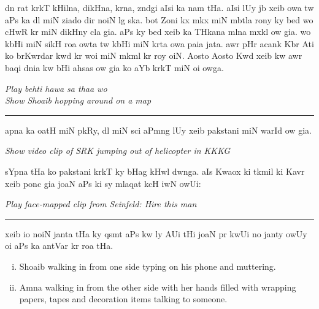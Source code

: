 \documentclass{article}
\begin{document}
	dn rat krkT kHilna, dikHna,  krna, zndgi aIsi ka nam tHa.
	aIsi lUy jb xeib  owa tw aPs ka dl  miN ziado dir noiN lg ska.
	bot Zoni kx mkx miN mbtla rony ky bed wo  cHwR kr  miN  dikHny cla gia.
	aPs ky bed xeib ka THkana mlna mxkl ow gia.
	wo kbHi  miN  sikH roa owta tw kbHi  miN  krta owa paia jata.
	awr pHr acank Kbr Ati ko brKwrdar  kwd kr woi  miN mkml kr roy oiN. 
	Aosto Aosto Kwd xeib kw awr baqi dnia kw bHi ahsas ow gia ko aYb  krkT miN oi owga.

\begin{enpara}
	\itshape
	Play behti hawa sa thaa wo\\
	Show Shoaib hopping around on a map
\end{enpara}

\rule{\textwidth}{1pt}

	apna  ka  oatH miN pkRy, dl miN sci aPmng lUy xeib pakstani miN warId ow gia.

\begin{enpara}
	\itshape
	Show video clip of SRK jumping out of helicopter in KKKG
\end{enpara}
\vspace{0.5\baselineskip}

	sYpna tHa ko pakstani krkT ky bHag kHwl dwnga.
	aIs Kwaox ki tkmil ki Kavr xeib  ponc gia joaN aPs ki  sy mlaqat kcH iwN owUi: 

\begin{enpara}
	\itshape
	Play face-mapped clip from Seinfeld: Hire this man
\end{enpara}



\rule{\textwidth}{1pt}

	xeib io noiN janta tHa ky qsmt aPs kw  ly AUi tHi joaN pr kwUi no janty owUy oi aPs ka antVar kr roa tHa.

\begin{enpara}
	\begin{enumerate}[(i)]
		\item Shoaib walking in from one side typing on his phone and muttering.
		\item Amna walking in from the other side with her hands filled with wrapping papers, tapes and decoration items talking to someone.
	\end{enumerate}
\end{enpara}
\end{document}
